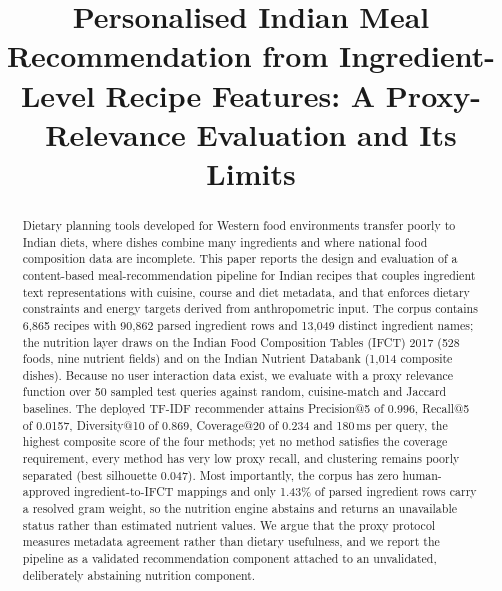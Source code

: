 \documentclass[conference]{IEEEtran}
\begin{document}
\title{Personalised Indian Meal Recommendation from Ingredient-Level Recipe
Features: A Proxy-Relevance Evaluation and Its Limits}

\author{
}

\maketitle

\begin{abstract}
Dietary planning tools developed for Western food environments transfer poorly to
Indian diets, where dishes combine many ingredients and where national food
composition data are incomplete. This paper reports the design and evaluation of a
content-based meal-recommendation pipeline for Indian recipes that couples
ingredient text representations with cuisine, course and diet metadata, and that
enforces dietary constraints and energy targets derived from anthropometric input.
The corpus contains 6{,}865 recipes with 90{,}862 parsed ingredient rows and
13{,}049 distinct ingredient names; the nutrition layer draws on the Indian Food
Composition Tables (IFCT) 2017 (528 foods, nine nutrient fields) and on the Indian
Nutrient Databank (1{,}014 composite dishes). Because no user interaction data
exist, we evaluate with a proxy relevance function over 50 sampled test queries
against random, cuisine-match and Jaccard baselines. The deployed TF-IDF
recommender attains Precision@5 of 0.996, Recall@5 of 0.0157, Diversity@10 of
0.869, Coverage@20 of 0.234 and 180\,ms per query, the highest composite score of
the four methods; yet no method satisfies the coverage requirement, every method
has very low proxy recall, and clustering remains poorly separated (best
silhouette 0.047). Most importantly, the corpus has zero human-approved
ingredient-to-IFCT mappings and only 1.43\% of parsed ingredient rows carry a
resolved gram weight, so the nutrition engine abstains and returns an unavailable
status rather than estimated nutrient values. We argue that the proxy protocol
measures metadata agreement rather than dietary usefulness, and we report the
pipeline as a validated recommendation component attached to an unvalidated,
deliberately abstaining nutrition component.
\end{abstract}
\end{document}
